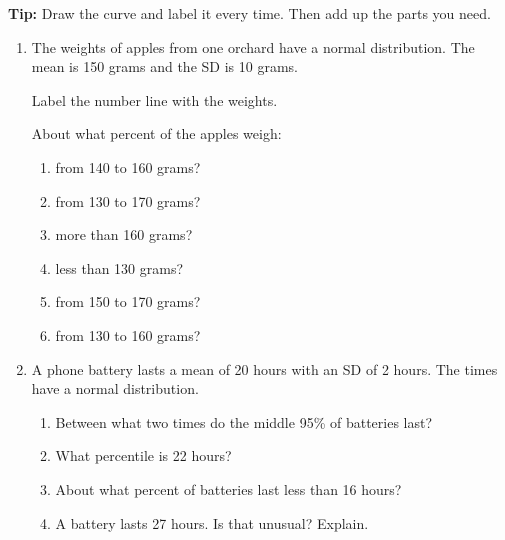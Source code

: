 \documentclass[11pt]{article}
\begin{document}
\vspace{0.6em}
\textbf{Tip:} Draw the curve and label it every time. Then add up the parts you need.

\partner

\newpage
\begin{enumerate}

\item The weights of apples from one orchard have a normal distribution. The mean is 150 grams and the SD is 10 grams.

\vspace{0.3em}
Label the number line with the weights.
\begin{center}
\end{center}
About what percent of the apples weigh:
\begin{enumerate}[itemsep=1.6em]
  \item from 140 to 160 grams? 
  \item from 130 to 170 grams? 
  \item more than 160 grams? 
  \item less than 130 grams? 
  \item from 150 to 170 grams? 
  \item from 130 to 160 grams? 
\end{enumerate}

\work{1em}
\item A phone battery lasts a mean of 20 hours with an SD of 2 hours. The times have a normal distribution.
\begin{enumerate}[itemsep=1.6em]
  \item Between what two times do the middle 95\% of batteries last? 
  \item What percentile is 22 hours? 
  \item About what percent of batteries last less than 16 hours? 
  \item A battery lasts 27 hours. Is that unusual? Explain.


\end{enumerate}
\end{enumerate}
\end{document}
